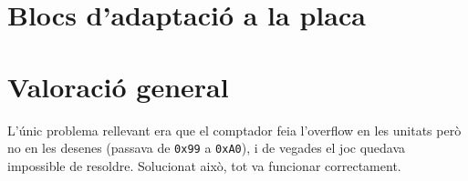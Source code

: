 \section{Blocs d'adaptació a la placa}

\section{Valoració general}

L'únic problema rellevant era que el comptador feia l'overflow en les unitats
però no en les desenes (passava de \texttt{0x99} a \texttt{0xA0}), i de vegades
el joc quedava impossible de resoldre. Solucionat això, tot va funcionar correctament.
